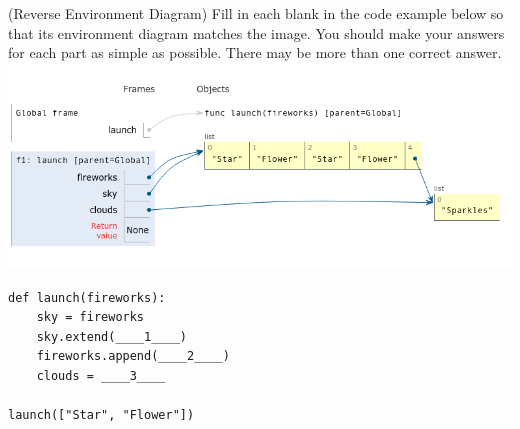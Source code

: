 \begin{blocksection}
\question (Reverse Environment Diagram) Fill in each blank in the code example below so that its environment diagram matches the image. 
You should make your answers for each part as simple as possible. There may be more than one correct answer.
\newline
\includegraphics[width=.9\textwidth]{fireworks-diagram.png}
\newline

\begin{lstlisting}
def launch(fireworks):
    sky = fireworks
    sky.extend(____1____)
    fireworks.append(____2____)
    clouds = ____3____

launch(["Star", "Flower"])
\end{lstlisting}
\end{blocksection}

\begin{blocksection}
\end{blocksection}


